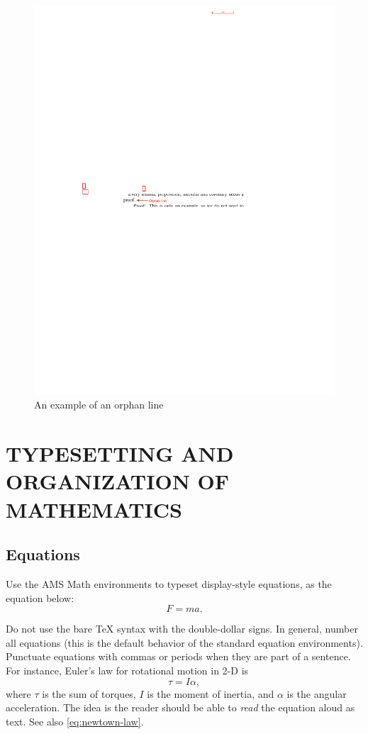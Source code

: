 \documentclass[letterpaper, 10 pt, conference]{ieeeconf}
\begin{document}
\begin{figure}
  \centering
  \includegraphics[width=0.9\linewidth]{figures/orphan-line}
  \caption{An example of an orphan line}
  \label{fig:orphan-line}
\end{figure}

\section{TYPESETTING AND ORGANIZATION OF MATHEMATICS}
\subsection{Equations}

Use the AMS Math environments to typeset display-style equations, as the equation below:
\begin{equation}
  \label{eq:newtown-law}
  F=ma.
\end{equation}

Do not use the bare \TeX{} syntax with the double-dollar signs. In general, number all equations (this is the default behavior of the standard equation environments). Punctuate equations with commas or periods when they are part of a sentence. For instance, Euler's law for rotational motion in 2-D is
\begin{equation}
  \label{eq:euler-law}
  \tau=I\alpha,
\end{equation}
where $\tau$ is the sum of torques, $I$ is the moment of inertia, and $\alpha$ is the angular acceleration. The idea is the reader should be able to \emph{read} the equation aloud as text. See also \eqref{eq:newtown-law}.
\end{document}
